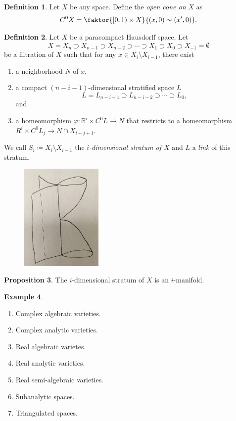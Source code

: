 \documentclass[10pt,letterpaper,cm]{nupset}
\theoremstyle{definition}
\newtheorem{definition}{Definition}[subsection]
\newtheorem{exmp}[definition]{Example}
\theoremstyle{theorem}
\newtheorem{prop}[definition]{Proposition}
\theoremstyle{remark}
\newcommand{\R}{\mathbb{R}}
\newcommand{\1}{\mathbb{1}}
\newcommand{\0}{\vec 0}
\begin{document}
\begin{definition}
Let $X$ be any space. Define the \textit{open cone on $X$} as $$C^0{X} =\faktor{[0,1) \times X}{\left(x,0\right) \sim \left(x',0\right)} .$$
\end{definition}

\begin{definition}
Let $X$ be a paracompact Hausdorff space. Let $$ X= X_n \supset X_{n-1} \supset X_{n-2} \supset \cdots \supset X_1 \supset X_0 \supset X_{-1} = \emptyset  $$ be a filtration of $X$ such that for any $x\in X_i \setminus X_{i-1}$, there exist 
\begin{enumerate}[label=(\roman*)]
\item a neighborhood $N$ of $x$,
\item a compact $\left(n-i-1\right)$-dimensional stratified space $L$ $$L = L_{n-i-1} \supset  L_{n-i-2} \supset \cdots \supset L_{0},$$ and
\item a homeomorphism $\varphi : \R^i \times C^0{L} \to N$ that restricts to a homeomorphism $R^i \times C^0{L_j}\to N \cap X_{i+j+1}$.  
\end{enumerate}
We call $S_i\coloneqq  X_i \setminus X_{i-1}$ the \textit{$i$-dimensional stratum of $X$} and $L$ a \textit{link} of this stratum. 
\begin{figure}[H]
\centering
\includegraphics[width=40mm]{stratified.jpg}
\end{figure}
\end{definition}


\begin{prop}
The $i$-dimensional stratum of $X$ is an $i$-manifold.
\end{prop}


\begin{exmp} $ $
\begin{enumerate}
\item Complex algebraic varieties.
\item Complex analytic varieties.
\item Real algebraic varietes.
\item Real analytic varieties.
\item Real semi-algebraic varieties.
\item Subanalytic spaces.
\item Triangulated spaces.
\end{enumerate}
\end{exmp}
\end{document}
